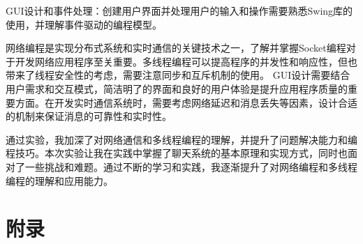 \documentclass[UTF8,12pt]{article}
\begin{document}
GUI设计和事件处理：创建用户界面并处理用户的输入和操作需要熟悉Swing库的使用，并理解事件驱动的编程模型。

网络编程是实现分布式系统和实时通信的关键技术之一，了解并掌握Socket编程对于开发网络应用程序至关重要。多线程编程可以提高程序的并发性和响应性，但也带来了线程安全性的考虑，需要注意同步和互斥机制的使用。
GUI设计需要结合用户需求和交互模式，简洁明了的界面和良好的用户体验是提升应用程序质量的重要方面。在开发实时通信系统时，需要考虑网络延迟和消息丢失等因素，设计合适的机制来保证消息的可靠性和实时性。

通过实验，我加深了对网络通信和多线程编程的理解，并提升了问题解决能力和编程技巧。本次实验让我在实践中掌握了聊天系统的基本原理和实现方式，同时也面对了一些挑战和难题。通过不断的学习和实践，我逐渐提升了对网络编程和多线程编程的理解和应用能力。

\newpage

\section{附录}
\end{document}
